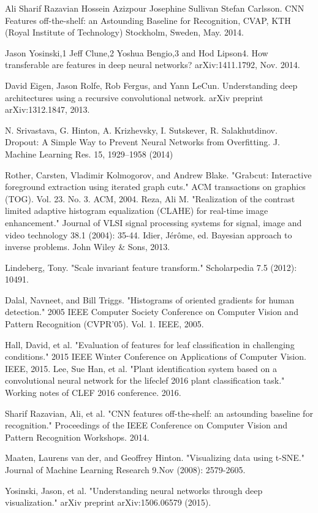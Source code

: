 \documentclass[journal, 10pt]{IEEEtran}
\begin{document}
\begin{thebibliography}{1}
    Ali Sharif Razavian Hossein Azizpour Josephine Sullivan Stefan Carlsson. CNN Features off-the-shelf: an Astounding Baseline for Recognition, CVAP, KTH (Royal Institute of Technology) Stockholm, Sweden, May. 2014.

    Jason Yosinski,1 Jeff Clune,2 Yoshua Bengio,3 and Hod Lipson4. How transferable are features in deep neural networks? arXiv:1411.1792, Nov. 2014.

    David Eigen, Jason Rolfe, Rob Fergus, and Yann LeCun. Understanding deep architectures using a recursive convolutional network. arXiv preprint arXiv:1312.1847, 2013.

    N. Srivastava, G. Hinton, A. Krizhevsky, I. Sutskever, R. Salakhutdinov. Dropout: A Simple Way to Prevent Neural Networks from Overfitting. J. Machine Learning Res. 15, 1929–1958 (2014)

    Rother, Carsten, Vladimir Kolmogorov, and Andrew Blake. "Grabcut: Interactive foreground extraction using iterated graph cuts." ACM transactions on graphics (TOG). Vol. 23. No. 3. ACM, 2004.
    Reza, Ali M. "Realization of the contrast limited adaptive histogram equalization (CLAHE) for real-time image enhancement." Journal of VLSI signal processing systems for signal, image and video technology 38.1 (2004): 35-44.
    Idier, Jérôme, ed. Bayesian approach to inverse problems. John Wiley \& Sons, 2013.

    Lindeberg, Tony. "Scale invariant feature transform." Scholarpedia 7.5 (2012): 10491.

    Dalal, Navneet, and Bill Triggs. "Histograms of oriented gradients for human detection." 2005 IEEE Computer Society Conference on Computer Vision and Pattern Recognition (CVPR'05). Vol. 1. IEEE, 2005.

  Hall, David, et al. "Evaluation of features for leaf classification in challenging conditions." 2015 IEEE Winter Conference on Applications of Computer Vision. IEEE, 2015.
  Lee, Sue Han, et al. "Plant identification system based on a convolutional neural network for the lifeclef 2016 plant classification task." Working notes of CLEF 2016 conference. 2016.

  Sharif Razavian, Ali, et al. "CNN features off-the-shelf: an astounding baseline for recognition." Proceedings of the IEEE Conference on Computer Vision and Pattern Recognition Workshops. 2014.

  Maaten, Laurens van der, and Geoffrey Hinton. "Visualizing data using t-SNE." Journal of Machine Learning Research 9.Nov (2008): 2579-2605.

  Yosinski, Jason, et al. "Understanding neural networks through deep visualization." arXiv preprint arXiv:1506.06579 (2015).
 
\end{thebibliography}
\end{document}
